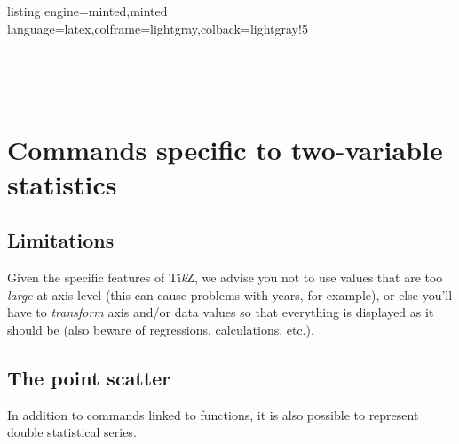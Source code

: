 \documentclass[11pt,a4paper]{ltxdoc}
\providecommand\tikzlogo{Ti\textit{k}Z}
\let\TikZ\tikzlogo
\begin{document}
\begin{tcblisting}{listing engine=minted,minted language=latex,colframe=lightgray,colback=lightgray!5}
\begin{GraphTikz}[x=0.4cm,y=0.4cm,Xmin=-4,Xmax=6,Ymin=-3,Ymax=7]
\end{GraphTikz}
~~
\begin{GraphTikz}[x=0.4cm,y=0.4cm,Xmin=-4,Xmax=6,Ymin=-3,Ymax=7]
\end{GraphTikz}
~~
\begin{GraphTikz}[x=0.4cm,y=0.4cm,Xmin=-4,Xmax=6,Ymin=-3,Ymax=7]
\end{GraphTikz}

\begin{GraphTikz}[x=0.4cm,y=0.4cm,Xmin=-4,Xmax=6,Ymin=-3,Ymax=7]
\end{GraphTikz}
\end{tcblisting}

\pagebreak

\section{Commands specific to two-variable statistics}

\subsection{Limitations}

Given the specific features of \TikZ, we advise you not to use values that are too \textit{large} at axis level (this can cause problems with years, for example), or else you'll have to \textit{transform} axis and/or data values so that everything is displayed as it should be (also beware of regressions, calculations, etc.).

\subsection{The point scatter}\label{scatter}

In addition to commands linked to functions, it is also possible to represent double statistical series.
\end{document}
